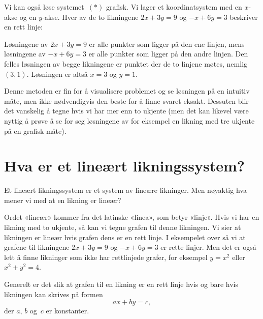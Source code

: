 \begin{ex}
\label{ex:grafisk-losning}
Vi kan også løse systemet~$(\ast)$ grafisk.  Vi lager et
koordinatsystem med en $x$-akse og en $y$-akse.  Hver av de to
likningene $2x+3y=9$ og $-x+6y=3$ beskriver en rett linje:
\begin{center}
\end{center}
Løsningene av $2x + 3y = 9$ er  alle punkter som ligger på den
ene linjen, mens løsningene av $-x + 6y = 3$ er alle punkter som
ligger på den andre linjen.  Den felles løsningen av begge likningene
er punktet der de to linjene møtes, nemlig $(3,1)$.  Løsningen er
altså $x = 3$ og $y = 1$.

Denne metoden er fin for å visualisere problemet og se løsningen på en
intuitiv måte, men ikke nødvendigvis den beste for å finne svaret
eksakt.  Dessuten blir det vanskelig å tegne hvis vi har mer enn to
ukjente (men det kan likevel være nyttig å prøve å se for seg
løsningene av for eksempel en likning med tre ukjente på en grafisk
måte).
\end{ex}


\section*{Hva er et lineært likningssystem?}

Et lineært likningssystem er et system av lineære likninger.  Men
nøyaktig hva mener vi med at en likning er lineær?

Ordet «lineær» kommer fra det latinske «linea», som betyr «linje».
Hvis vi har en likning med to ukjente, så kan vi tegne grafen til
denne likningen.  Vi sier at likningen er lineær hvis grafen dens er
en rett linje.  I eksempelet over så vi at grafene til likningene
$2x + 3y = 9$ og $-x + 6y = 3$ er rette linjer.  Men det er også lett
å finne likninger som ikke har rettlinjede grafer, for eksempel
$y = x^2$ eller $x^2 + y^2 = 4$.

Generelt er det slik at grafen til en likning er en rett linje hvis og
bare hvis likningen kan skrives på formen
\[
ax + by = c,
\]
der $a$, $b$ og~$c$ er konstanter.

